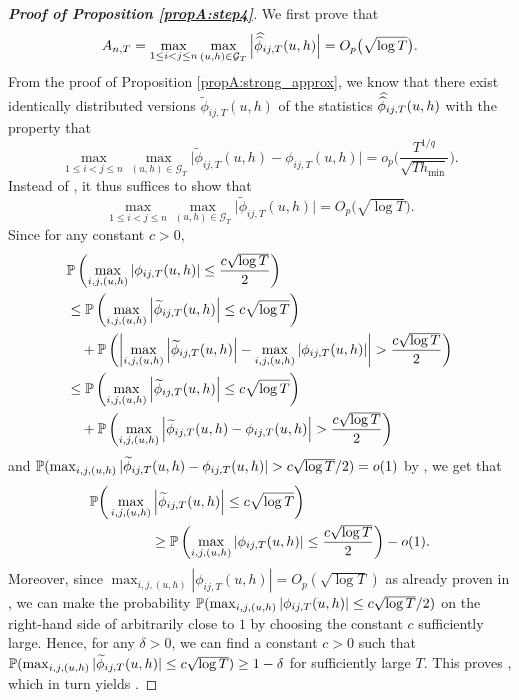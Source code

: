 \documentclass[12pt]{article}
\makeatletter
\renewcommand{\eqref}[1]{\tagform@{\ref{#1}}}
\makeatother
\begin{document}
\begin{proof}[\textnormal{\textbf{Proof of Proposition \ref{propA:step4}}}]
We first prove that 
\begin{equation}\label{eq:Ant:1} 
A_{n,T}  = \max_{1 \le i< j \le n} \max_{(u,h) \in \mathcal{G}_T} \Big|\doublehat{\phi}_{ij,T}(u,h)\Big| = O_p\big(\sqrt{\log T}\big).
\end{equation}
From the proof of Proposition \ref{propA:strong_approx}, we know that there exist identically distributed versions $\widetilde{\phi}_{ij, T}(u, h)$ of the statistics $\doublehat{\phi}_{ij,T}(u,h)$ with the property that 
\begin{equation}\label{eq:result-from-propA-strong_approx}
\max_{1\le i < j \le n} \max_{(u,h) \in \mathcal{G}_T} \big| \widetilde{\phi}_{ij, T}(u,h) - \phi_{ij, T}(u,h) \big| = o_p \Big( \frac{T^{1/q}}{\sqrt{Th_{\min}}} \Big). 
\end{equation}
Instead of \eqref{eq:Ant:1}, it thus suffices to show that 
\begin{equation}\label{eq:Ant:2} 
\max_{1 \le i< j \le n}\max_{(u,h) \in \mathcal{G}_T}\Big|\widetilde{\phi}_{ij, T}(u, h)\Big| = O_p\big(\sqrt{\log T}\big).
\end{equation}
Since for any constant $c > 0$, 
\begin{align*}
&\mathbb{P}\left( \max_{i,j,(u,h)}\left|\phi_{ij, T}(u, h)\right| \leq \frac{c \sqrt{\log T}}{2} \right) \\
&\leq \mathbb{P}\left( \max_{i,j,(u,h)}\left|\widetilde{\phi}_{ij, T}(u, h)\right| \leq c \sqrt{\log T}\right) \\
& \quad + \mathbb{P}\left(\left|\max_{i,j,(u,h)}\left|\widetilde{\phi}_{ij, T}(u, h)\right| - \max_{i,j,(u,h)}\left|\phi_{ij, T}(u, h)\right| \right| > \frac{c\sqrt{\log T}}{2}\right) \\
&\leq \mathbb{P}\left( \max_{i,j,(u,h)}\left|\widetilde{\phi}_{ij, T}(u, h)\right| \leq c \sqrt{\log T}\right) \\
&\quad + \mathbb{P}\left(\max_{i,j,(u,h)}\left|\widetilde{\phi}_{ij, T}(u, h)- \phi_{ij, T}(u, h)\right| > \frac{c\sqrt{\log T}}{2}\right)
\end{align*}
and $\mathbb{P}(\max_{i,j,(u,h)}|\widetilde{\phi}_{ij, T}(u, h)- \phi_{ij, T}(u, h)| > c \sqrt{\log T}/2) = o(1)$ by \eqref{eq:result-from-propA-strong_approx}, we get that
\begin{align} 
\mathbb{P}\bigg(\max_{i,j,(u,h)} & \left|\widetilde{\phi}_{ij, T}(u, h)\right| \leq c\sqrt{\log T} \bigg) \nonumber \\
 & \geq \mathbb{P}\left( \max_{i,j,(u,h)}\left|\phi_{ij, T}(u, h)\right| \leq \frac{c\sqrt{\log T}}{2}\right) - o(1). \label{eq:Ant:intermediate}
\end{align}
Moreover, since $\max_{i,j,(u,h)}\left|\phi_{ij, T}(u, h)\right| = O_p(\sqrt{\log{T}})$ as already proven in \eqref{eq:phi-bound-max-Gaussians}, we can make the probability $\mathbb{P}( \max_{i,j,(u,h)}|\phi_{ij, T}(u, h)| \leq c\sqrt{\log T}/2)$ on the right-hand side of \eqref{eq:Ant:intermediate} arbitrarily close to $1$ by choosing the constant $c$ sufficiently large. Hence, for any $\delta > 0$, we can find a constant $c > 0$ such that $\mathbb{P}(\max_{i,j,(u,h)}|\widetilde{\phi}_{ij, T}(u, h)| \leq c\sqrt{\log T} ) \ge 1 - \delta$ for sufficiently large $T$. This proves \eqref{eq:Ant:2}, which in turn yields \eqref{eq:Ant:1}. 



\end{proof}
\end{document}
